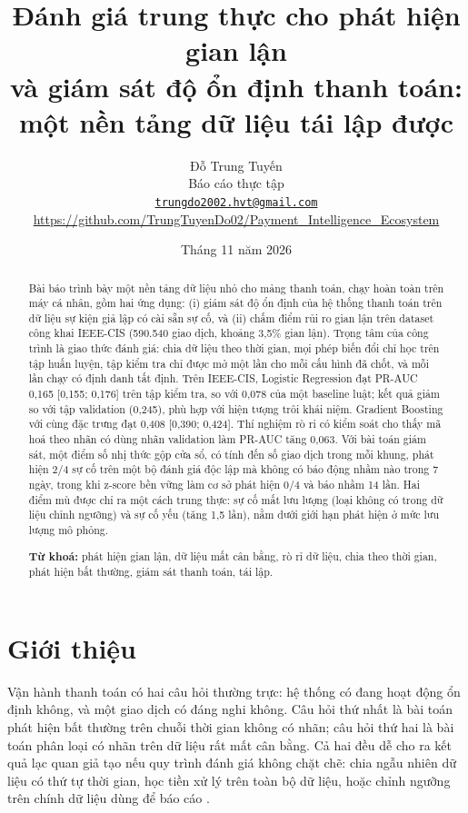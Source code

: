 \documentclass[11pt,a4paper]{article}
\title{\textbf{Đánh giá trung thực cho phát hiện gian lận\\ và giám sát độ ổn định thanh toán:\\ một nền tảng dữ liệu tái lập được}}
\author{Đỗ Trung Tuyến\\[2pt]
\small Báo cáo thực tập\\
\small \href{mailto:trungdo2002.hvt@gmail.com}{\texttt{trungdo2002.hvt@gmail.com}}\\
\small \url{https://github.com/TrungTuyenDo02/Payment_Intelligence_Ecosystem}}
\date{Tháng 11 năm 2026}
\theoremstyle{definition}
\theoremstyle{remark}
\numberwithin{equation}{section}
\begin{document}
\maketitle

\begin{abstract}
\noindent Bài báo trình bày một nền tảng dữ liệu nhỏ cho mảng thanh toán, chạy hoàn toàn trên máy cá nhân, gồm hai ứng dụng: (i) giám sát độ ổn định của hệ thống thanh toán trên dữ liệu sự kiện giả lập có cài sẵn sự cố, và (ii) chấm điểm rủi ro gian lận trên dataset công khai IEEE-CIS (590.540 giao dịch, khoảng 3,5\% gian lận). Trọng tâm của công trình là giao thức đánh giá: chia dữ liệu theo thời gian, mọi phép biến đổi chỉ học trên tập huấn luyện, tập kiểm tra chỉ được mở một lần cho mỗi cấu hình đã chốt, và mỗi lần chạy có định danh tất định. Trên IEEE-CIS, Logistic Regression đạt PR-AUC 0,165 [0,155; 0,176] trên tập kiểm tra, so với 0,078 của một baseline luật; kết quả giảm so với tập validation (0,245), phù hợp với hiện tượng trôi khái niệm. Gradient Boosting với cùng đặc trưng đạt 0,408 [0,390; 0,424]. Thí nghiệm rò rỉ có kiểm soát cho thấy mã hoá theo nhãn có dùng nhãn validation làm PR-AUC tăng 0,063. Với bài toán giám sát, một điểm số nhị thức gộp cửa sổ, có tính đến số giao dịch trong mỗi khung, phát hiện 2/4 sự cố trên một bộ đánh giá độc lập mà không có báo động nhầm nào trong 7 ngày, trong khi z-score bền vững làm cơ sở phát hiện 0/4 và báo nhầm 14 lần. Hai điểm mù được chỉ ra một cách trung thực: sự cố mất lưu lượng (loại không có trong dữ liệu chỉnh ngưỡng) và sự cố yếu (tăng 1,5 lần), nằm dưới giới hạn phát hiện ở mức lưu lượng mô phỏng.

\medskip
\noindent\textbf{Từ khoá:} phát hiện gian lận, dữ liệu mất cân bằng, rò rỉ dữ liệu, chia theo thời gian, phát hiện bất thường, giám sát thanh toán, tái lập.
\end{abstract}

\section{Giới thiệu}
Vận hành thanh toán có hai câu hỏi thường trực: hệ thống có đang hoạt động ổn định không, và một giao dịch có đáng nghi không. Câu hỏi thứ nhất là bài toán phát hiện bất thường trên chuỗi thời gian không có nhãn; câu hỏi thứ hai là bài toán phân loại có nhãn trên dữ liệu rất mất cân bằng. Cả hai đều dễ cho ra kết quả lạc quan giả tạo nếu quy trình đánh giá không chặt chẽ: chia ngẫu nhiên dữ liệu có thứ tự thời gian, học tiền xử lý trên toàn bộ dữ liệu, hoặc chỉnh ngưỡng trên chính dữ liệu dùng để báo cáo \cite{kaufman,kapoor,wu}.
\end{document}
